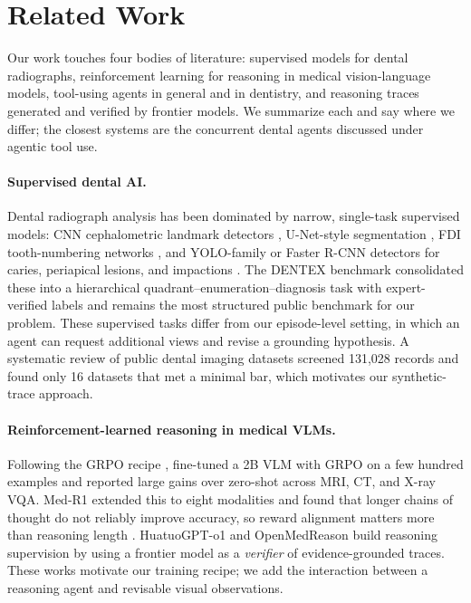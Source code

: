 \section{Related Work}
\label{sec:related}

Our work touches four bodies of literature: supervised models for dental radiographs, reinforcement learning for
reasoning in medical vision-language models, tool-using agents in general and in dentistry, and reasoning traces
generated and verified by frontier models. We summarize each and say where we differ; the closest systems are the
concurrent dental agents discussed under agentic tool use.

\paragraph{Supervised dental AI.}
Dental radiograph analysis has been dominated by narrow, single-task supervised models: CNN
cephalometric landmark detectors \citep{arik2017cephalometry}, U-Net-style segmentation
\citep{ronneberger2015unet}, FDI tooth-numbering networks \citep{tuzoff2019tooth}, and
YOLO-family or Faster R-CNN detectors \citep{redmon2016yolo,ren2015faster} for caries,
periapical lesions, and impactions \citep{hamamci2024dentex}. The DENTEX benchmark consolidated these into a
hierarchical quadrant--enumeration--diagnosis task with expert-verified labels
\citep{hamamci2024dentex} and remains the most structured public benchmark for our problem.
These supervised tasks differ from our episode-level setting, in which an agent can request
additional views and revise a grounding hypothesis. A systematic review of public dental
imaging datasets \citep{uribe2024systematic} screened 131{,}028 records and found only 16
datasets that met a minimal bar, which motivates our synthetic-trace approach.

\paragraph{Reinforcement-learned reasoning in medical VLMs.}
Following the GRPO recipe \citep{deepseek2025r1}, \citet{pan2025medvlmr1} fine-tuned a 2B VLM
with GRPO on a few hundred examples and reported large gains over zero-shot across MRI, CT, and
X-ray VQA. Med-R1 extended this to eight modalities and found that longer chains of thought do
not reliably improve accuracy, so reward alignment matters more than reasoning length
\citep{wang2025medr1}. HuatuoGPT-o1 \citep{chen2024huatuo} and OpenMedReason
\citep{openmedreason2026} build reasoning supervision by using a frontier model as a
\emph{verifier} of evidence-grounded traces. These works motivate our training recipe; we add
the interaction between a reasoning agent and revisable visual observations.

